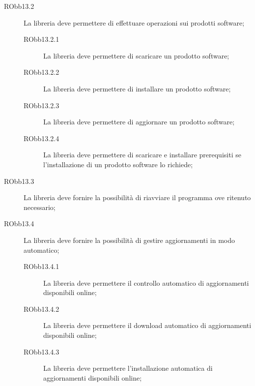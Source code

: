 \documentclass[../RelazioneFinale]{subfiles}
\begin{document}
\begin{description}
\begin{description}
					\item[RObb13.2] La libreria deve permettere di effettuare operazioni sui prodotti software;
					\begin{description}
						\item[RObb13.2.1] La libreria deve permettere di scaricare un prodotto software;
						\item[RObb13.2.2] La libreria deve permettere di installare un prodotto software;
						\item[RObb13.2.3] La libreria deve permettere di aggiornare un prodotto software;
						
						\item[RObb13.2.4] La libreria deve permettere di scaricare e installare prerequisiti se l'installazione di un prodotto software lo richiede;
					\end{description}
					
					\item[RObb13.3] La libreria deve fornire la possibilità di riavviare il programma ove ritenuto necessario;
					
					\item[RObb13.4] La libreria deve fornire la possibilità di gestire aggiornamenti in modo automatico;
					\begin{description}
						\item[RObb13.4.1] La libreria deve permettere il controllo automatico di aggiornamenti disponibili online;
						\item[RObb13.4.2] La libreria deve permettere il download automatico di aggiornamenti disponibili online;
						\item[RObb13.4.3] La libreria deve permettere l'installazione automatica di aggiornamenti disponibili online;
					\end{description}										
					
				\end{description}
				
				
			\end{description} %
		
\end{document}
